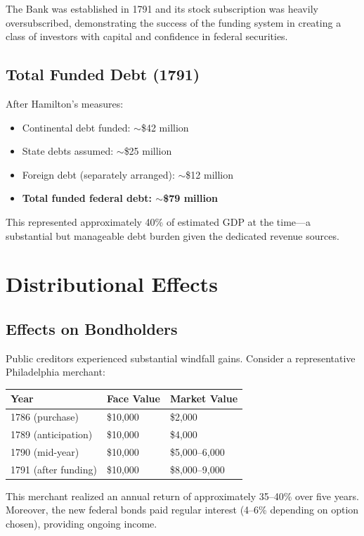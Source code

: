\documentclass[12pt]{article}
\begin{document}
The Bank was established in 1791 and its stock subscription was heavily oversubscribed, demonstrating the success of the funding system in creating a class of investors with capital and confidence in federal securities.

\subsection{Total Funded Debt (1791)}

After Hamilton's measures:
\begin{itemize}
\item Continental debt funded: $\sim$\$42 million
\item State debts assumed: $\sim$\$25 million
\item Foreign debt (separately arranged): $\sim$\$12 million
\item \textbf{Total funded federal debt: $\sim$\$79 million}
\end{itemize}

This represented approximately 40\% of estimated GDP at the time---a substantial but manageable debt burden given the dedicated revenue sources.

\section{Distributional Effects}\label{sec:effects}

\subsection{Effects on Bondholders}

Public creditors experienced substantial windfall gains. Consider a representative Philadelphia merchant:

\begin{center}
\begin{tabular}{lll}
\toprule
Year & Face Value & Market Value \\
\midrule
1786 (purchase) & \$10,000 & \$2,000 \\
1789 (anticipation) & \$10,000 & \$4,000 \\
1790 (mid-year) & \$10,000 & \$5,000--6,000 \\
1791 (after funding) & \$10,000 & \$8,000--9,000 \\
\bottomrule
\end{tabular}
\end{center}

This merchant realized an annual return of approximately 35--40\% over five years. Moreover, the new federal bonds paid regular interest (4--6\% depending on option chosen), providing ongoing income.
\end{document}

